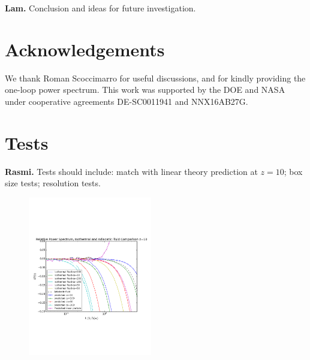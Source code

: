 \documentclass[aps,showpacs,twocolumn,floats,prd,superscriptaddress,nofootinbib]{revtex4}
\begin{document}
{\bf Lam.} Conclusion and ideas for future investigation.

\vspace{0.1in}

\section*{Acknowledgements} 
We thank Roman Scoccimarro for useful discussions, and for kindly providing
the one-loop power spectrum.
This work was supported by the DOE and NASA under cooperative agreements
DE-SC0011941 and NNX16AB27G. 

\appendix

\section{Tests}

{\bf Rasmi.} Tests should include: match with linear theory prediction
at $z=10$; box size tests; resolution tests.

\begin{figure}[htb]
\begin{center}
\includegraphics[width=0.48\textwidth]{z10fig}
\end{center}
\caption
{
}
\label{z10fig}
\end{figure}




\end{document}
